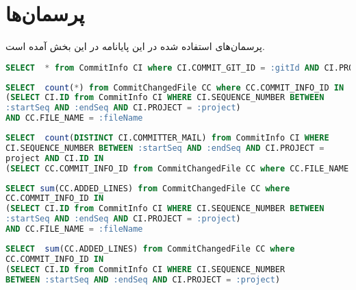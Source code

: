 \chapter{پرسمان‌ها}
\label{app-queries}
پرسمان‌های استفاده شده در این پایانامه در این بخش آمده است. 





\begin{latin}
\begin{lstlisting}[language=SQL]
SELECT  * from CommitInfo CI where CI.COMMIT_GIT_ID = :gitId AND CI.PROJECT = :project
\end{lstlisting}
\end{latin}
\label{code:commit-info}

\begin{latin}
\begin{lstlisting}[language=SQL]
SELECT  count(*) from CommitChangedFile CC where CC.COMMIT_INFO_ID IN
(SELECT CI.ID from CommitInfo CI WHERE CI.SEQUENCE_NUMBER BETWEEN 
:startSeq AND :endSeq AND CI.PROJECT = :project)
AND CC.FILE_NAME = :fileName
\end{lstlisting}
\end{latin}
\label{code:comm}


\begin{latin}
\begin{lstlisting}[language=SQL]
SELECT  count(DISTINCT CI.COMMITTER_MAIL) from CommitInfo CI WHERE
CI.SEQUENCE_NUMBER BETWEEN :startSeq AND :endSeq AND CI.PROJECT = 
project AND CI.ID IN 
(SELECT CC.COMMIT_INFO_ID from CommitChangedFile CC where CC.FILE_NAME = :fileName)
\end{lstlisting}
\end{latin}

\begin{latin}
\begin{lstlisting}[language=SQL]
SELECT sum(CC.ADDED_LINES) from CommitChangedFile CC where
CC.COMMIT_INFO_ID IN
(SELECT CI.ID from CommitInfo CI WHERE CI.SEQUENCE_NUMBER BETWEEN 
:startSeq AND :endSeq AND CI.PROJECT = :project)
AND CC.FILE_NAME = :fileName
\end{lstlisting}
\end{latin}
\label{code:added-line-file}

\begin{latin}
\begin{lstlisting}[language=SQL]
SELECT  sum(CC.ADDED_LINES) from CommitChangedFile CC where 
CC.COMMIT_INFO_ID IN
(SELECT CI.ID from CommitInfo CI WHERE CI.SEQUENCE_NUMBER
BETWEEN :startSeq AND :endSeq AND CI.PROJECT = :project)
\end{lstlisting}
\end{latin}
\label{code:added-line-project}


